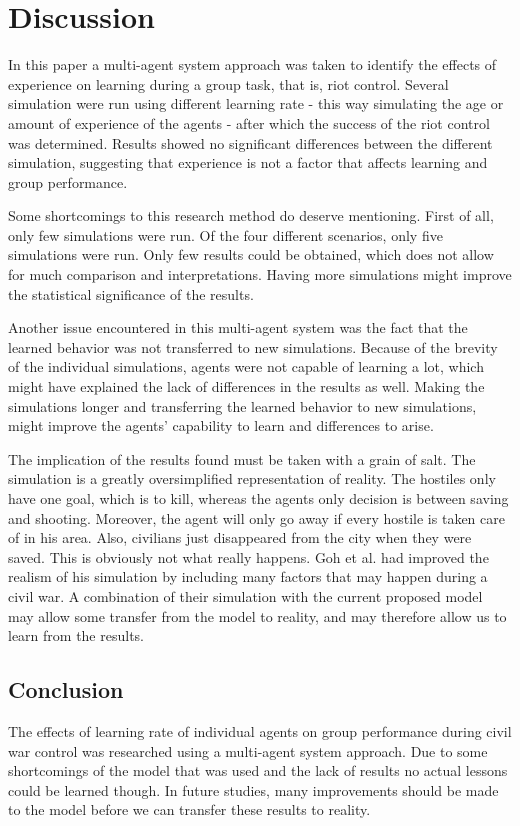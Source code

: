\chapter{Discussion}
In this paper a multi-agent system approach was taken to identify the effects of experience on learning during a group task, that is, riot control. Several simulation were run using different learning rate - this way simulating the age or amount of experience of the agents - after which the success of the riot control was determined. Results showed no significant differences between the different simulation, suggesting that experience is not a factor that affects learning and group performance.

Some shortcomings to this research method do deserve mentioning. First of all, only few simulations were run. Of the four different scenarios, only five simulations were run. Only few results could be obtained, which does not allow for much comparison and interpretations. Having more simulations might improve the statistical significance of the results. %

Another issue encountered in this multi-agent system was the fact that the learned behavior was not transferred to new simulations. Because of the brevity of the individual simulations, agents were not capable of learning a lot, which might have explained the lack of differences in the results as well. Making the simulations longer and transferring the learned behavior to new simulations, might improve the agents' capability to learn and differences to arise. 

The implication of the results found must be taken with a grain of salt. The simulation is a greatly oversimplified representation of reality. The hostiles only have one goal, which is to kill, whereas the agents only decision is between saving and shooting. Moreover, the agent will only go away if every hostile is taken care of in his area. Also, civilians just disappeared from the city when they were saved. This is obviously not what really happens. Goh et al. \citep{goh2006modeling} had improved the realism of his simulation by including many factors that may happen during a civil war. A combination of their simulation with the current proposed model may allow some transfer from the model to reality, and may therefore allow us to learn from the results. 

\section{Conclusion}
The effects of learning rate of individual agents on group performance during civil war control was researched using a multi-agent system approach. Due to some shortcomings of the model that was used and the lack of results no actual lessons could be learned though. In future studies, many improvements should be made to the model before we can transfer these results to reality. 